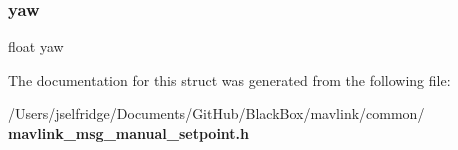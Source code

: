 \mbox{\label{struct____mavlink__manual__setpoint__t_a7efc219781df4a1e281cb5d348b7fbf9}} 
\subsubsection{yaw}
{\footnotesize\ttfamily float yaw}



The documentation for this struct was generated from the following file\+:\begin{DoxyCompactItemize}
\item 
/\+Users/jselfridge/\+Documents/\+Git\+Hub/\+Black\+Box/mavlink/common/\textbf{ mavlink\+\_\+msg\+\_\+manual\+\_\+setpoint.\+h}\end{DoxyCompactItemize}
